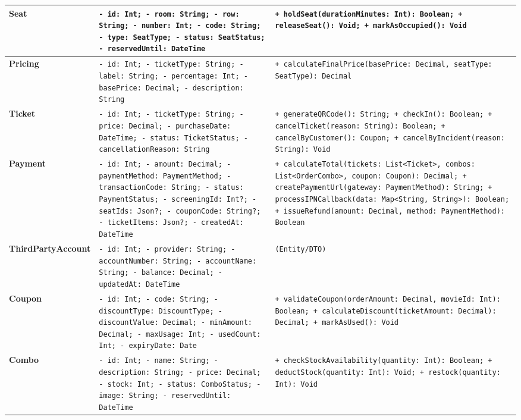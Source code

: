 \begin{longtable}{|p{3.2cm}|p{6.2cm}|p{6.1cm}|}
\textbf{Seat} & \texttt{\small - id: Int; - room: String; - row: String; - number: Int; - code: String; - type: SeatType; - status: SeatStatus; - reservedUntil: DateTime} & \texttt{\small + holdSeat(durationMinutes: Int): Boolean; + releaseSeat(): Void; + markAsOccupied(): Void} \\ \hline
\textbf{Pricing} & \texttt{\small - id: Int; - ticketType: String; - label: String; - percentage: Int; - basePrice: Decimal; - description: String} & \texttt{\small + calculateFinalPrice(basePrice: Decimal, seatType: SeatType): Decimal} \\ \hline
\textbf{Ticket} & \texttt{\small - id: Int; - ticketType: String; - price: Decimal; - purchaseDate: DateTime; - status: TicketStatus; - cancellationReason: String} & \texttt{\small + generateQRCode(): String; + checkIn(): Boolean; + cancelTicket(reason: String): Boolean; + cancelByCustomer(): Coupon; + cancelByIncident(reason: String): Void} \\ \hline
\textbf{Payment} & \texttt{\small - id: Int; - amount: Decimal; - paymentMethod: PaymentMethod; - transactionCode: String; - status: PaymentStatus; - screeningId: Int?; - seatIds: Json?; - couponCode: String?; - ticketItems: Json?; - createdAt: DateTime} & \texttt{\small + calculateTotal(tickets: List<Ticket>, combos: List<OrderCombo>, coupon: Coupon): Decimal; + createPaymentUrl(gateway: PaymentMethod): String; + processIPNCallback(data: Map<String, String>): Boolean; + issueRefund(amount: Decimal, method: PaymentMethod): Boolean} \\ \hline
\textbf{ThirdPartyAccount} & \texttt{\small - id: Int; - provider: String; - accountNumber: String; - accountName: String; - balance: Decimal; - updatedAt: DateTime} & \texttt{\small (Entity/DTO)} \\ \hline
\textbf{Coupon} & \texttt{\small - id: Int; - code: String; - discountType: DiscountType; - discountValue: Decimal; - minAmount: Decimal; - maxUsage: Int; - usedCount: Int; - expiryDate: Date} & \texttt{\small + validateCoupon(orderAmount: Decimal, movieId: Int): Boolean; + calculateDiscount(ticketAmount: Decimal): Decimal; + markAsUsed(): Void} \\ \hline
\textbf{Combo} & \texttt{\small - id: Int; - name: String; - description: String; - price: Decimal; - stock: Int; - status: ComboStatus; - image: String; - reservedUntil: DateTime} & \texttt{\small + checkStockAvailability(quantity: Int): Boolean; + deductStock(quantity: Int): Void; + restock(quantity: Int): Void} \\ \hline

\end{longtable}
